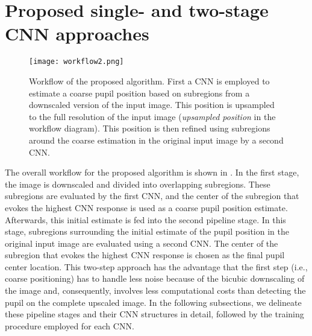 \section{Proposed single- and two-stage CNN approaches}
\begin{figure}[h]
	\begin{center}
		\texttt{[image: workflow2.png]}
	\end{center}
	\caption{
		Workflow of the proposed algorithm. First a CNN is employed to estimate
		a coarse pupil position based on subregions from a downscaled version of
		the input image. This position is upsampled to the
		full resolution of the input image (\emph{upsampled position} in the
		workflow diagram). This position is then refined using subregions around
		the coarse estimation in the original input image by a second CNN.
	}
	\label{fig:workflow}
\end{figure}
The overall workflow for the proposed algorithm is shown in
.
In the first stage, the image is downscaled and divided into overlapping
subregions. These subregions are evaluated by the first CNN, and the center of
the subregion that evokes the highest CNN response is used as a coarse pupil
position estimate. Afterwards, this initial estimate is fed into the second pipeline stage. In this
stage, subregions surrounding the initial estimate of the pupil position in the
original input image are evaluated using a second CNN. The center of the
subregion that evokes the highest CNN response is chosen as the final pupil
center location. This two-step approach has the advantage that the first step (i.e., coarse
positioning) has to handle less noise because of the bicubic downscaling of the
image and, consequently, involves less computational costs than detecting the
pupil on the complete upscaled image. In the following subsections, we delineate these pipeline stages and their CNN structures in detail, followed by the training procedure employed for each CNN.


